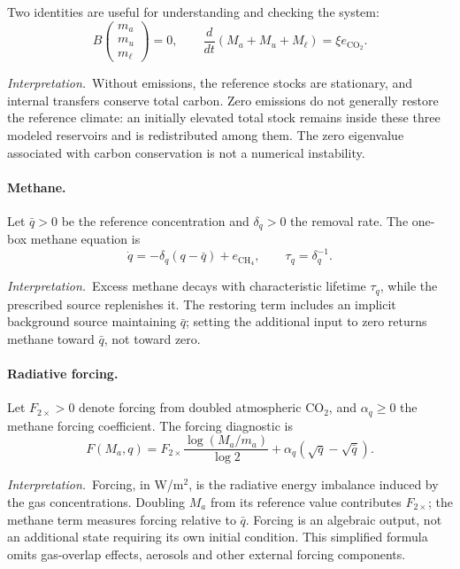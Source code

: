 \documentclass[11pt,a4paper]{article}
\newcommand{\interp}{\par\smallskip\noindent\textit{Interpretation.}\ }
\begin{document}
Two identities are useful for understanding and checking the system:
\begin{equation}\label{eq:conservation}
 B\begin{pmatrix}m_a\\m_u\\m_\ell\end{pmatrix}=0,\qquad
 \frac{d}{dt}(M_a+M_u+M_\ell)=\xi e_{\mathrm{CO_2}}.
\end{equation}
\interp Without emissions, the reference stocks are stationary, and
internal transfers conserve total carbon. Zero emissions do not generally
restore the reference climate: an initially elevated total stock remains
inside these three modeled reservoirs and is redistributed among them.
The zero eigenvalue associated with carbon conservation is not a numerical
instability.

\paragraph{Methane.}
Let $\bar q>0$ be the reference concentration and $\delta_q>0$ the removal
rate. The one-box methane equation is
\begin{equation}\label{eq:methane}
 \dot q=-\delta_q(q-\bar q)+e_{\mathrm{CH_4}},
 \qquad \tau_q=\delta_q^{-1}.
\end{equation}
\interp Excess methane decays with characteristic lifetime $\tau_q$,
while the prescribed source replenishes it. The restoring term includes
an implicit background source maintaining $\bar q$; setting the additional
input to zero returns methane toward $\bar q$, not toward zero.

\paragraph{Radiative forcing.}
Let $F_{2\times}>0$ denote forcing from doubled atmospheric CO$_2$,
and $\alpha_q\geq0$ the methane forcing coefficient. The forcing diagnostic is
\begin{equation}\label{eq:forcing}
 F(M_a,q)=F_{2\times}\frac{\log(M_a/m_a)}{\log2}
       +\alpha_q(\sqrt q-\sqrt{\bar q}).
\end{equation}
\interp Forcing, in W/m$^2$, is the radiative energy imbalance induced by
the gas concentrations. Doubling $M_a$ from its reference value contributes
$F_{2\times}$; the methane term measures forcing relative to $\bar q$.
Forcing is an algebraic output, not an additional state requiring its
own initial condition. This simplified formula omits gas-overlap effects,
aerosols and other external forcing components.
\end{document}
